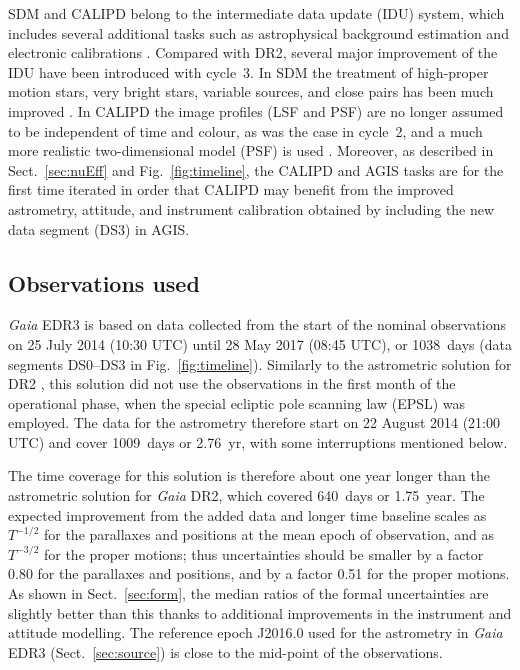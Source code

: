 \documentclass[longauth]{aa} %
\begin{document}
SDM and CALIPD belong to the intermediate data update (IDU) system, which includes 
several additional tasks such as astrophysical background estimation 
 and electronic calibrations .
Compared with DR2, several major improvement of the IDU have been introduced with
cycle~3. In SDM the treatment of high-proper motion stars, very bright stars, variable 
sources, and close pairs has been much improved \citep{EDR3-DPACP-124}. In CALIPD the 
image profiles (LSF and PSF) are no longer assumed to be independent of time and
colour, as was the case in cycle~2, and a much more realistic two-dimensional model (PSF) is 
used \citep{EDR3-DPACP-73}. Moreover, as described in Sect.~\ref{sec:nuEff} and
Fig.~\ref{fig:timeline}, the CALIPD and AGIS tasks are for the first time iterated in 
order that CALIPD may benefit from the improved astrometry, attitude, and instrument 
calibration obtained by including the new data segment (DS3) in AGIS.



\subsection{Observations used}
\label{sec:data}

\textit{Gaia} EDR3 is based on data collected from the start of the nominal observations 
on 25 July 2014 (10:30 UTC) until 28 May 2017 (08:45 UTC), or 1038~days
(data segments DS0--DS3 in Fig.~\ref{fig:timeline}).
Similarly to the astrometric solution for DR2 , this
solution did not use the observations in the first month of the operational phase, when
the special ecliptic pole scanning law (EPSL) was employed. The data for the astrometry 
therefore start on 22 August 2014 (21:00 UTC) and cover 1009~days or 2.76~yr, with some 
interruptions mentioned below. 

The time coverage for this solution is therefore about one year longer than the astrometric 
solution for \textit{Gaia} DR2, which covered 640~days or 1.75~year. The expected 
improvement from the added data and longer time baseline scales as $T^{-1/2}$ for the
parallaxes and positions at the mean epoch of observation, and as $T^{-3/2}$ for the
proper motions; thus uncertainties should be smaller by a factor 0.80 for the parallaxes
and positions, and by a factor 0.51 for the proper motions. As shown in Sect.~\ref{sec:form}, the
median ratios of the formal uncertainties are slightly better than this thanks to additional
improvements in the instrument and attitude modelling. The reference epoch J2016.0 used 
for the astrometry in \textit{Gaia} EDR3 (Sect.~\ref{sec:source}) is close to the mid-point of 
the observations.
\end{document}

